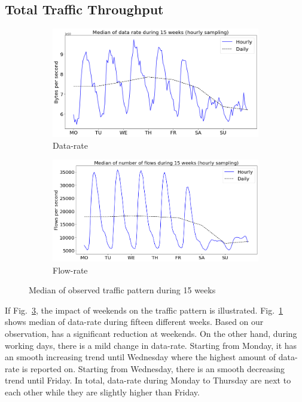 \documentclass[10pt, journal, letterpaper]{IEEEtran}
\newcommand\linearFigSze{0.48}
\begin{document}
\subsection{Total Traffic Throughput}
\begin{figure}
    \begin{subfigure}{\linearFigSze\textwidth}
          \centering
          \includegraphics[width=\columnwidth]{img/OW_byterate.png}
          \caption{Data-rate}
          \label{fig:OW_bps}
    \end{subfigure}
    \begin{subfigure}{\linearFigSze\textwidth}
          \centering
          \includegraphics[width=\columnwidth]{img/OW_flowrate.png}
          \caption{Flow-rate}
          \label{fig:OW_fps}
    \end{subfigure}
    \caption{Median of observed traffic pattern during 15 weeks}
    \label{fig:OW_bps_fps}
\end{figure}
If Fig.~\ref{fig:OW_bps_fps}, the impact of weekends on the traffic pattern is illustrated. Fig.~\ref{fig:OW_bps} shows median of data-rate during fifteen different weeks. Based on our observation, has a significant reduction at weekends. On the other hand, during working days, there is a mild change in data-rate. Starting from Monday, it has an smooth increasing trend until Wednesday where the highest amount of data-rate is reported on. Starting from Wednesday, there is an smooth decreasing trend until Friday. In total, data-rate during Monday to Thursday are next to each other while they are slightly higher than Friday.
\end{document}
